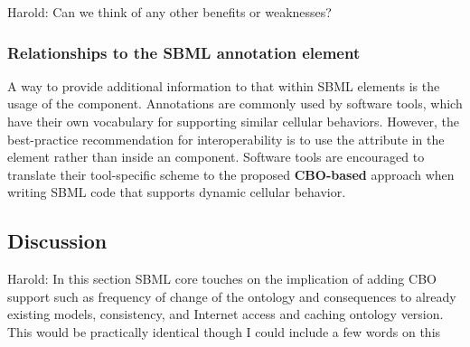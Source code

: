 {\color{red} Harold: \notice Can we think of any other benefits or weaknesses?}

\subsubsection{Relationships to the SBML annotation element}
\label{subsubsec:CBO&Annot}

A way to provide additional information to that within SBML elements is the  usage of the \Annotation component. Annotations are commonly used by software tools, which have their own vocabulary for supporting similar cellular behaviors. However, the best-practice recommendation for interoperability is to use the  attribute in the \Event element rather than inside an \Annotation component. Software tools are encouraged to translate their tool-specific \Annotation scheme to the proposed \textbf{CBO-based} approach when writing SBML code that supports dynamic cellular behavior.

\subsection{Discussion}
\label{subsec:CBODiscussion}

{\color{red} Harold: \notice In this section SBML core touches on the implication of adding CBO support such as frequency of change of the ontology and consequences to already existing models, consistency, and Internet access and caching ontology version. This would be practically identical though I could include a few words on this}

